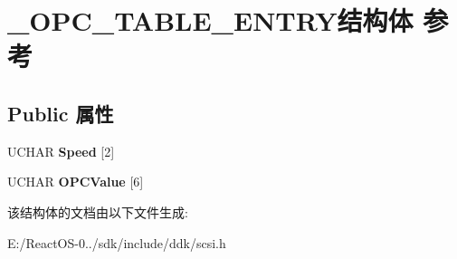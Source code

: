\hypertarget{struct___o_p_c___t_a_b_l_e___e_n_t_r_y}{}\section{\+\_\+\+O\+P\+C\+\_\+\+T\+A\+B\+L\+E\+\_\+\+E\+N\+T\+R\+Y结构体 参考}
\label{struct___o_p_c___t_a_b_l_e___e_n_t_r_y}
\subsection*{Public 属性}
\begin{DoxyCompactItemize}
\item 
\mbox{\label{struct___o_p_c___t_a_b_l_e___e_n_t_r_y_a6f8c70aa0d0b80b8442a7bc85a44783e}} 
U\+C\+H\+AR {\bfseries Speed} \mbox{[}2\mbox{]}
\item 
\mbox{\label{struct___o_p_c___t_a_b_l_e___e_n_t_r_y_a6f18b8da77e4e4553cd7900f5544e0a3}} 
U\+C\+H\+AR {\bfseries O\+P\+C\+Value} \mbox{[}6\mbox{]}
\end{DoxyCompactItemize}


该结构体的文档由以下文件生成\+:\begin{DoxyCompactItemize}
\item 
E\+:/\+React\+O\+S-\/0../sdk/include/ddk/scsi.\+h\end{DoxyCompactItemize}
